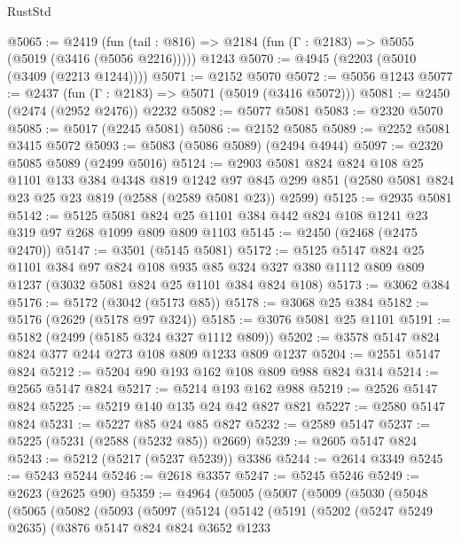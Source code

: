 \begin{lexlean}{RustStd}
\begin{coremodule}
@5065 := @2419
    (fun (tail : @816) => @2184 (fun (Γ : @2183) => @5055 (@5019 (@3416 (@5056 @2216)))))
    @1243
@5070 := @4945 (@2203 (@5010 (@3409 (@2213 @1244))))
@5071 := @2152 @5070
@5072 := @5056 @1243
@5077 := @2437 (fun (Γ : @2183) => @5071 (@5019 (@3416 @5072)))
@5081 := @2450 (@2474 (@2952 @2476)) @2232
@5082 := @5077 @5081
@5083 := @2320 @5070
@5085 := @5017 (@2245 @5081)
@5086 := @2152 @5085
@5089 := @2252 @5081 @3415 @5072
@5093 := @5083 (@5086 @5089) (@2494 @4944)
@5097 := @2320 @5085 @5089 (@2499 @5016)
@5124 := @2903
    @5081
    @824
    @824
    @108
    @25
    @1101
    @133
    @384
    @4348
    @819
    @1242
    @97
    @845
    @299
    @851
    (@2580 @5081 @824 @23 @25 @23 @819 (@2588 (@2589 @5081 @23)) @2599)
@5125 := @2935 @5081
@5142 := @5125
    @5081
    @824
    @25
    @1101
    @384
    @442
    @824
    @108
    @1241
    @23
    @319
    @97
    @268
    @1099
    @809
    @809
    @1103
@5145 := @2450 (@2468 (@2475 @2470))
@5147 := @3501 (@5145 @5081)
@5172 := @5125
    @5147
    @824
    @25
    @1101
    @384
    @97
    @824
    @108
    @935
    @85
    @324
    @327
    @380
    @1112
    @809
    @809
    @1237
    (@3032 @5081 @824 @25 @1101 @384 @824 @108)
@5173 := @3062 @384
@5176 := @5172 (@3042 (@5173 @85))
@5178 := @3068 @25 @384
@5182 := @5176 (@2629 (@5178 @97 @324))
@5185 := @3076 @5081 @25 @1101
@5191 := @5182 (@2499 (@5185 @324 @327 @1112 @809))
@5202 := @3578 @5147 @824 @824 @377 @244 @273 @108 @809 @1233 @809 @1237
@5204 := @2551 @5147 @824
@5212 := @5204 @90 @193 @162 @108 @809 @988 @824 @314
@5214 := @2565 @5147 @824
@5217 := @5214 @193 @162 @988
@5219 := @2526 @5147 @824
@5225 := @5219 @140 @135 @24 @42 @827 @821
@5227 := @2580 @5147 @824
@5231 := @5227 @85 @24 @85 @827
@5232 := @2589 @5147
@5237 := @5225 (@5231 (@2588 (@5232 @85)) @2669)
@5239 := @2605 @5147 @824
@5243 := @5212 (@5217 (@5237 @5239)) @3386
@5244 := @2614 @3349
@5245 := @5243 @5244
@5246 := @2618 @3357
@5247 := @5245 @5246
@5249 := @2623 (@2625 @90)
@5359 := @4964
    (@5005
      (@5007
        (@5009
          (@5030
            (@5048
              (@5065
                (@5082
                  (@5093
                    (@5097
                      (@5124
                        (@5142
                          (@5191
                            (@5202
                              (@5247 @5249 @2635)
                              (@3876
                                @5147
                                @824
                                @824
                                @3652
                                @1233

\end{coremodule}
\end{lexlean}
